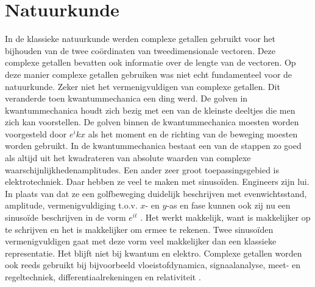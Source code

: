 \documentclass[11pt,fleqn]{book} %
\begin{document}
\section{Natuurkunde}
In de klassieke natuurkunde werden complexe getallen gebruikt voor het bijhouden van de twee coördinaten van tweedimensionale vectoren. Deze complexe getallen bevatten ook informatie over de lengte van de vectoren. Op deze manier complexe getallen gebruiken was niet echt fundamenteel voor de natuurkunde. Zeker niet het vermenigvuldigen van complexe getallen.
Dit veranderde toen kwantummechanica een ding werd. De golven in kwantummechanica houdt zich bezig met een van de kleinste deeltjes die men zich kan voorstellen. De golven binnen de kwantummechanica moesten worden voorgesteld door $e^ikx$ \cite{motl} als het moment en de richting van de beweging moesten worden gebruikt. In de kwantummechanica bestaat een van de stappen zo goed als altijd uit het kwadrateren van absolute waarden van complexe waarschijnlijkhedenamplitudes.
Een ander zeer groot toepassingsgebied is elektrotechniek. Daar hebben ze veel te maken met sinusoïden. Engineers zijn lui. In plaats van dat ze een golfbeweging duidelijk beschrijven met evenwichtsstand, amplitude, vermenigvuldiging t.o.v. $x$- en $y$-as en fase kunnen ook zij nu een sinusoïde beschrijven in de vorm $e^{it}$ \cite{harish}. Het werkt makkelijk, want is makkelijker op te schrijven en het is makkelijker om ermee te rekenen. Twee sinusoïden vermenigvuldigen gaat met deze vorm veel makkelijker dan een klassieke representatie.
Het blijft niet bij kwantum en elektro. Complexe getallen worden ook reeds gebruikt bij bijvoorbeeld vloeistofdynamica, signaalanalyse, meet- en regeltechniek, differentiaalrekeningen en relativiteit \cite{complex_numbers}.
\end{document}
